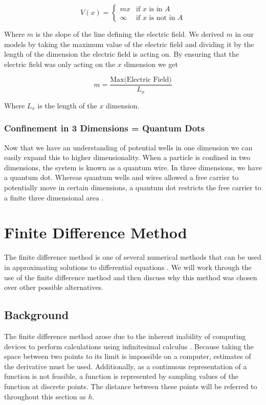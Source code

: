 \documentclass[authoryearcitations]{UoYCSproject}
\begin{document}
\begin{equation}
V(x) = \begin{cases}
          mx & \text{if $x$ is in $A$}  \\
          \infty    & \text{if $x$ is not in $A$} 
         \end{cases}
\label{vx2}
\end{equation}

Where $m$ is the slope of the line defining the electric field. We derived $m$ in our models by
taking the maximum value of the electric field and dividing it by the length of the dimension 
the electric field is acting on. By ensuring that the electric field was only acting on the $x$ dimension
we get

$$m = \frac{\text{Max(Electric Field)}}{L_x}$$

Where $L_{x}$ is the length of the $x$ dimension.

\subsubsection{Confinement in 3 Dimensions = Quantum Dots}
Now that we have an understanding of potential wells in one dimension we can easily expand this to higher
dimensionality. When a particle is confined in two dimensions, the system is known as a quantum wire. In three 
dimensions, we have a quantum dot. Whereas quantum wells and wires allowed a free carrier to potentially move in 
certain dimensions, a quantum dot restricts the free carrier to a finite three dimensional area \cite{dots}. 


\section{Finite Difference Method}
The finite difference method is one of several numerical methods that can be used in approximating
solutions to differential equations \cite{Hamming}. We will work through the use of the finite 
difference method and then discuss why this method was chosen over other possible alternatives. 

\subsection{Background}
The finite difference method arose due to the inherent inability of computing devices to perform
calculations using infinitesimal calculus \cite{Hamming, zhilin}. Because taking the space
between two points to its limit is impossible on a computer, estimates of the derivative must be
used. Additionally, as a continuous representation of a function is not feasible, a function is represented
by sampling values of the function at discrete points. The distance between these points will
be referred to throughout this section as $h$. 
\end{document}
